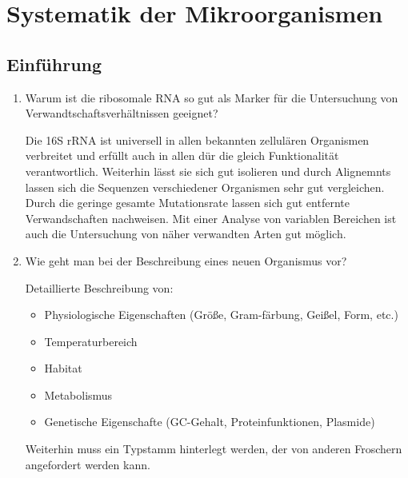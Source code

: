 
\section{Systematik der Mikroorganismen}
\subsection{Einführung}
\begin{enumerate}
\item Warum ist die ribosomale RNA so gut als Marker für die Untersuchung von Verwandtschaftsverhältnissen geeignet?
	
	Die 16S rRNA ist universell in allen bekannten zellulären Organismen verbreitet
	und erfüllt auch in allen dür die gleich Funktionalität verantwortlich.
	Weiterhin lässt sie sich gut isolieren
	und durch Alignemnts lassen sich die Sequenzen verschiedener Organismen sehr gut vergleichen.
	Durch die geringe gesamte Mutationsrate lassen sich gut entfernte Verwandschaften nachweisen.
	Mit einer Analyse von variablen Bereichen ist auch die Untersuchung von näher verwandten Arten gut möglich.

\item Wie geht man bei der Beschreibung eines neuen Organismus vor?
	
	Detaillierte Beschreibung von:
	\begin{itemize}
		\item Physiologische Eigenschaften (Größe, Gram-färbung, Geißel, Form, etc.)
		\item Temperaturbereich
		\item Habitat
		\item Metabolismus
		\item Genetische Eigenschafte (GC-Gehalt, Proteinfunktionen, Plasmide)
	\end{itemize}

	Weiterhin muss ein Typstamm hinterlegt werden,
	der von anderen Froschern angefordert werden kann.

\end{enumerate}

